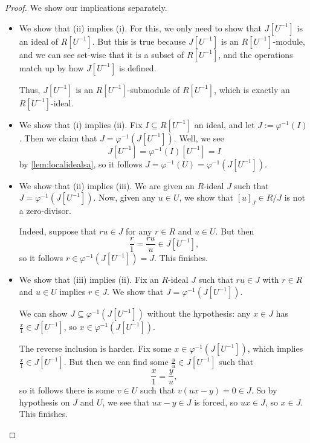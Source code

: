\documentclass[../notes.tex]{subfiles}
\begin{document}
\begin{proof}
	We show our implications separately.
	\begin{itemize}
		\item We show that (ii) implies (i). For this, we only need to show that $J\left[U^{-1}\right]$ is an ideal of $R\left[U^{-1}\right]$. But this is true because $J\left[U^{-1}\right]$ is an $R\left[U^{-1}\right]$-module, and we can see set-wise that it is a subset of $R\left[U^{-1}\right]$, and the operations match up by how $J\left[U^{-1}\right]$ is defined.

		Thus, $J\left[U^{-1}\right]$ is an $R\left[U^{-1}\right]$-submodule of $R\left[U^{-1}\right]$, which is exactly an $R\left[U^{-1}\right]$-ideal.

		\item We show that (i) implies (ii). Fix $I\subseteq R\left[U^{-1}\right]$ an ideal, and let $J:=\varphi^{-1}(I)$. Then we claim that $J=\varphi^{-1}\left(J\left[U^{-1}\right]\right)$. Well, we see
		\[J\left[U^{-1}\right]=\varphi^{-1}(I)\left[U^{-1}\right]=I\]
		by \autoref{lem:localidealsa}, so it follows $J=\varphi^{-1}(U)=\varphi^{-1}\left(J\left[U^{-1}\right]\right)$.

		\item We show that (ii) implies (iii). We are given an $R$-ideal $J$ such that $J=\varphi^{-1}\left(J\left[U^{-1}\right]\right)$. Now, given any $u\in U$, we show that $[u]_J\in R/J$ is not a zero-divisor.
		
		Indeed, suppose that $ru\in J$ for any $r\in R$ and $u\in U$. But then
		\[\frac r1=\frac{ru}u\in J\left[U^{-1}\right],\]
		so it follows $r\in\varphi^{-1}\left(J\left[U^{-1}\right]\right)=J$. This finishes.

		\item We show that (iii) implies (ii). Fix an $R$-ideal $J$ such that $ru\in J$ with $r\in R$ and $u\in U$ implies $r\in J$. We show that $J=\varphi^{-1}\left(J\left[U^{-1}\right]\right)$.

		We can show $J\subseteq\varphi^{-1}\left(J\left[U^{-1}\right]\right)$ without the hypothesis: any $x\in J$ has $\frac x1\in J\left[U^{-1}\right]$, so $x\in\varphi^{-1}\left(J\left[U^{-1}\right]\right)$.

		The reverse inclusion is harder. Fix some $x\in\varphi^{-1}\left(J\left[U^{-1}\right]\right)$, which implies $\frac x1\in J\left[U^{-1}\right]$. But then we can find some $\frac yu\in J\left[U^{-1}\right]$ such that
		\[\frac x1=\frac yu,\]
		so it follows there is some $v\in U$ such that $v(ux-y)=0\in J$. So by hypothesis on $J$ and $U$, we see that $ux-y\in J$ is forced, so $ux\in J$, so $x\in J$. This finishes.
		\qedhere
	\end{itemize}
\end{proof}
\end{document}
